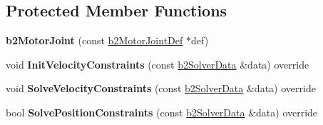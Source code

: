 \subsection*{Protected Member Functions}
\begin{DoxyCompactItemize}
\item 
\mbox{\label{classb2_motor_joint_ac0c56b069910915e1ceef3b89c035833}} 
{\bfseries b2\+Motor\+Joint} (const \hyperlink{structb2_motor_joint_def}{b2\+Motor\+Joint\+Def} $\ast$def)
\item 
\mbox{\label{classb2_motor_joint_aeffac9d1e3940c362962319d1bdb3f22}} 
void {\bfseries Init\+Velocity\+Constraints} (const \hyperlink{structb2_solver_data}{b2\+Solver\+Data} \&data) override
\item 
\mbox{\label{classb2_motor_joint_a620c75b301aeab409f9d50a041a80fb8}} 
void {\bfseries Solve\+Velocity\+Constraints} (const \hyperlink{structb2_solver_data}{b2\+Solver\+Data} \&data) override
\item 
\mbox{\label{classb2_motor_joint_a4e56455ab7e90f82fc1f463efc9b59de}} 
bool {\bfseries Solve\+Position\+Constraints} (const \hyperlink{structb2_solver_data}{b2\+Solver\+Data} \&data) override
\end{DoxyCompactItemize}
